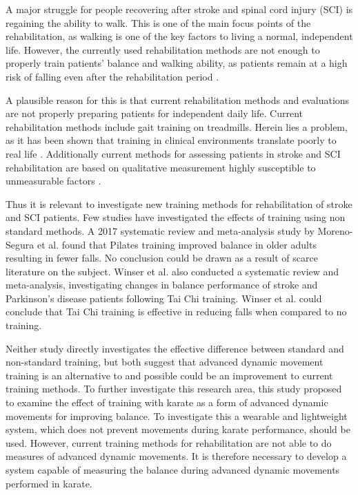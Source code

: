 
A major struggle for people recovering after stroke and spinal cord injury (SCI) is regaining the ability to walk. This is one of the main focus points of the rehabilitation, as walking is one of the key factors to living a normal, independent life. However, the currently used rehabilitation methods are not enough to properly train patients' balance and walking ability, as patients remain at a high risk of falling even after the rehabilitation period \cite{Blennerhassett2012, Hanger2014, Wannapakhe2015, Wong2016, Bhalla2016}.

A plausible reason for this is that current rehabilitation methods and evaluations are not properly preparing patients for independent daily life. Current rehabilitation methods include gait training on treadmills. Herein lies a problem, as it has been shown that training in clinical environments translate poorly to real life \cite{Basteris2014}. Additionally current methods for assessing patients in stroke and SCI rehabilitation are based on qualitative measurement highly susceptible to unmeasurable factors \cite{Wang2010, ANPT_SCI2018, ANPT_Stroke2018}. 

Thus it is relevant to investigate new training methods for rehabilitation of stroke and SCI patients. Few studies have investigated the effects of training using non standard methods. A 2017 systematic review and meta-analysis study by Moreno-Segura et al. \cite{Moreno2017} found that Pilates training improved balance in older adults resulting in fewer falls. No conclusion could be drawn as a result of scarce literature on the subject. Winser et al. \cite{Winser2018} also conducted a systematic review and meta-analysis, investigating changes in balance performance of stroke and Parkinson's disease patients following Tai Chi training. Winser et al. could conclude that Tai Chi training is effective in reducing falls when compared to no training.  

Neither study directly investigates the effective difference between standard and non-standard training, but both suggest that advanced dynamic movement training is an alternative to and possible could be an improvement to current training methods. 
To further investigate this research area, this study proposed to examine the effect of training with karate as a form of advanced dynamic movements for improving balance. 
To investigate this a wearable and lightweight system, which does not prevent movements during karate performance, should be used. However, current training methods for rehabilitation are not able to do measures of advanced dynamic movements. It is therefore necessary to develop a system capable of measuring the balance during advanced dynamic movements performed in karate. 

